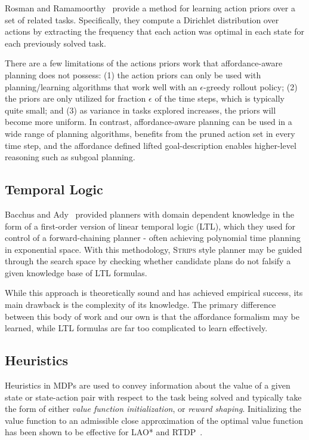\documentclass[conference]{IEEEtran}
\begin{document}
Rosman and Ramamoorthy~\citep{rosman2012good} provide a method for learning action priors over a set of related tasks. Specifically, they compute a Dirichlet distribution over actions by extracting the frequency that each action was optimal in each state for each previously solved task.

There are a few limitations of the actions priors work that affordance-aware planning does not possess: (1) the action priors can only be used with planning/learning algorithms that work well with an $\epsilon$-greedy rollout policy; (2) the priors are only utilized for fraction $\epsilon$ of the time steps, which is typically quite small; and (3) as variance in tasks explored increases, the priors will become more uniform. In contrast, affordance-aware planning can be used in a wide range of planning algorithms, benefits from the pruned action set in every time step, and the affordance defined lifted goal-description enables higher-level reasoning such as subgoal planning.

\subsection{Temporal Logic}

Bacchus and Ady~\citep{Bacchus95usingtemporal, Bacchus99usingtemporal} provided
planners with domain dependent knowledge in the form of a first-order version of linear
temporal logic (LTL), which they used for control of a forward-chaining planner - often
achieving polynomial time planning in exponential space. With this methodology, 
\textsc{Strips} style planner may be guided through the search space by checking 
whether candidate plans do not falsify a given knowledge base of LTL formulas.

While this approach is theoretically sound and has achieved empirical success, its main drawback is the complexity of its knowledge. The primary difference between this body of work and our own is that the affordance formalism may be learned, while LTL formulas are far too complicated to learn effectively.

\subsection{Heuristics}
Heuristics in MDPs are used to convey information about the value of a given state or state-action pair with respect to the task being solved and typically take the form of either {\em value function initialization},
or {\em reward shaping}. Initializing the value function to an admissible close approximation of the optimal value function has been shown to be effective for LAO* and RTDP~\citep{Hansen:1999qf}.
\end{document}
